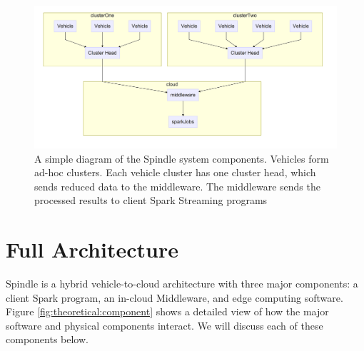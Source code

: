 \documentclass{thesis}
\begin{document}

    \begin{figure}
        \centering
        \includegraphics[width=0.8\linewidth]{binImages/theoretical-simple-system.png}
        \caption{A simple diagram of the Spindle system components. Vehicles form ad-hoc clusters.
        Each vehicle cluster has one cluster head, which sends reduced data to the middleware.
        The middleware sends the processed results to client Spark Streaming programs}
        \label{fig:theoretical:hlcomponents}
    \end{figure}

\section{Full Architecture}
    Spindle is a hybrid vehicle-to-cloud architecture with three major components: a client Spark program,
    an in-cloud Middleware, and edge computing software. Figure \ref{fig:theoretical:component} shows
    a detailed view of how the major software and physical components interact.
    We will discuss each of these components below.  
\end{document}
